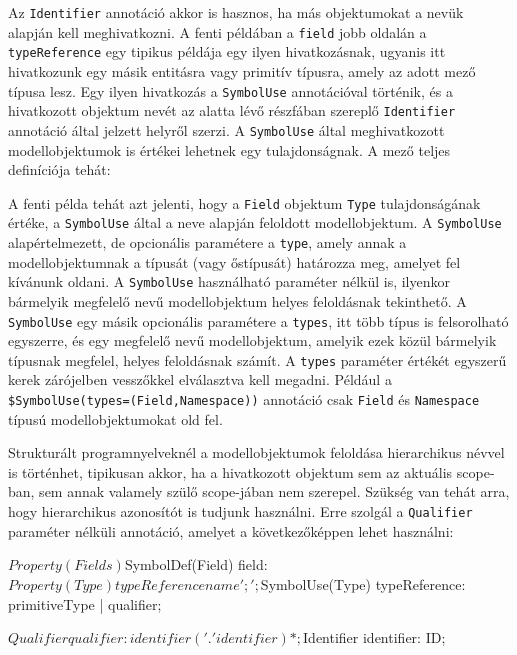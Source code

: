 \documentclass[12pt, a4paper]{report}
\newcommand{\f}[1]{\texttt{#1}}
\begin{document}
Az \f{Identifier} annotáció akkor is hasznos, ha más objektumokat a nevük alapján kell meghivatkozni. A fenti példában a \f{field} jobb oldalán a \f{typeReference} egy tipikus példája egy ilyen hivatkozásnak, ugyanis itt hivatkozunk egy másik entitásra vagy primitív típusra, amely az adott mező típusa lesz. Egy ilyen hivatkozás a \f{SymbolUse} annotációval történik, és a hivatkozott objektum nevét az alatta lévő részfában szereplő \f{Identifier} annotáció által jelzett helyről szerzi. A \f{SymbolUse} által meghivatkozott modellobjektumok is értékei lehetnek egy tulajdonságnak. A mező teljes definíciója tehát:


A fenti példa tehát azt jelenti, hogy a \f{Field} objektum \f{Type} tulajdonságának értéke, a \f{SymbolUse} által a neve alapján feloldott modellobjektum. A \f{SymbolUse} alapértelmezett, de opcionális paramétere a \f{type}, amely annak a modellobjektumnak a típusát  (vagy őstípusát) határozza meg, amelyet fel kívánunk oldani. A \f{SymbolUse} használható paraméter nélkül is, ilyenkor bármelyik megfelelő nevű modellobjektum helyes feloldásnak tekinthető. A \f{SymbolUse} egy másik opcionális paramétere a \f{types}, itt több típus is felsorolható egyszerre, és egy megfelelő nevű modellobjektum, amelyik ezek közül bármelyik típusnak megfelel, helyes feloldásnak számít. A \f{types} paraméter értékét egyszerű kerek zárójelben vesszőkkel elválasztva kell megadni. Például a \f{\$SymbolUse(types=(Field,Namespace))} annotáció csak \f{Field} és \f{Namespace} típusú modellobjektumokat old fel.

Strukturált programnyelveknél a modellobjektumok feloldása hierarchikus névvel is történhet, tipikusan akkor, ha a hivatkozott objektum sem az aktuális scope-ban, sem annak valamely szülő scope-jában nem szerepel. Szükség van tehát arra, hogy hierarchikus azonosítót is tudjunk használni. Erre szolgál a \f{Qualifier} paraméter nélküli annotáció, amelyet a következőképpen lehet használni:

\begin{antlr4code}
$Property(Fields)
$SymbolDef(Field)
field: $Property(Type) typeReference name ';';

$SymbolUse(Type)
typeReference: primitiveType | qualifier;

$Qualifier
qualifier: identifier ('.' identifier)*;

$Identifier
identifier: ID;
\end{antlr4code}
\end{document}
